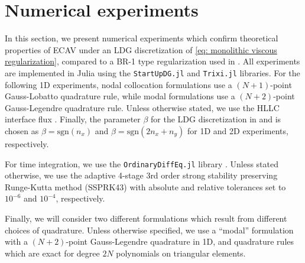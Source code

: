\documentclass{elsarticle}
\theoremstyle{definition}
\theoremstyle{plain}
\theoremstyle{plain}
\begin{document}
\section{Numerical experiments}\label{sec:section_5}

In this section, we present numerical experiments which confirm theoretical properties of ECAV under an LDG discretization of \eqref{eq: monolithic viscous regularization}, compared to a BR-1 type regularization used in \cite{chan2025artificial}. All experiments are implemented in Julia using the \verb+StartUpDG.jl+ and \verb+Trixi.jl+ \cite{ranocha2022adaptive} libraries. For the following 1D experiments, nodal collocation formulations use a $(N+1)$-point Gauss-Lobatto quadrature rule, while modal formulations use a $(N+2)$-point Gauss-Legendre quadrature rule. Unless otherwise stated, we use the HLLC interface flux \cite{batten1997choice}. Finally, the parameter $\beta$ for the LDG discretization in  and  is chosen as $\beta = \text{sgn}(n_x)$ and $\beta = \text{sgn}(2n_x + n_y)$ for 1D and 2D experiments, respectively. 

For time integration, we use the \verb+OrdinaryDiffEq.jl+ library \cite{rackauckas2017differentialequations}. Unless stated otherwise, we use the adaptive 4-stage 3rd order strong stability preserving Runge-Kutta method (SSPRK43) \cite{FCS2022, kraaijevanger1991contractivity, ranocha2022optimized} with absolute and relative tolerances set to $10^{-6}$ and $10^{-4}$, respectively. 

Finally, we will consider two different formulations which result from different choices of quadrature. Unless otherwise specified, we use a ``modal'' formulation with a $(N+2)$-point Gauss-Legendre quadrature in 1D, and quadrature rules which are exact for degree $2N$ polynomials on triangular elements. 
\end{document}
